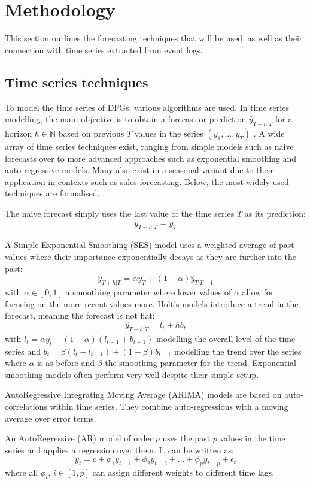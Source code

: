 \section{Methodology}\label{sec:methodology}
This section outlines the forecasting techniques that will be used, as well as their connection with time series extracted from event logs.

\subsection{Time series techniques}
To model the time series of DFGs, various algorithms are used.
In time series modelling, the main objective is to obtain a forecast or prediction $\hat{y}_{T+h|T}$ for a horizon $h\in \mathbb{N}$ based on previous $T$ values in the series $(y_1,...,y_T)$ \cite{hyndman2018forecasting}.
A wide array of time series techniques exist, ranging from simple models such as naive forecasts over to more advanced approaches such as exponential smoothing and auto-regressive models.
Many also exist in a seasonal variant due to their application in contexts such as sales forecasting.
Below, the most-widely used techniques are formalised.

The naive forecast simply uses the last value of the time series $T$ as its prediction:
\[\hat{y}_{T+h|T}=y_T\]

A Simple Exponential Smoothing (SES) model uses a weighted average of past values where their importance exponentially decays as they are further into the past:
\[\hat{y}_{T+h|T}=\alpha y_T + (1-\alpha)\hat{y}_{T|T-1}\]
with $\alpha \in [0,1]$ a smoothing parameter where lower values of $\alpha$ allow for focusing on the more recent values more.
Holt's models introduce a trend in the forecast, meaning the forecast is not flat:
\[\hat{y}_{T+h|T}=l_t + hb_t\]
with $l_t = \alpha y_t + (1-\alpha)(l_{t-1}+b_{t-1})$ modelling the overall level of the time series and $b_t=\beta(l_t-l_{t-1})+(1-\beta)b_{t-1}$ modelling the trend over the series where $\alpha$ is as before and $\beta$ the smoothing parameter for the trend.
Exponential smoothing models often perform very well despite their simple setup.

AutoRegressive Integrating Moving Average (ARIMA) models are based on auto-correlations within time series. 
They combine auto-regressions with a moving average over error terms.

An AutoRegressive (AR) model of order $p$ uses the past $p$ values in the time series and applies a regression over them. 
It can be written as:
\[y_t=c+\phi_1 y_{t-1} + \phi_2 y_{t-2} + \dots + \phi_p y_{t-p} + \epsilon_t\]
where all $\phi_i,\, i\in[1,p]$ can assign different weights to different time lags.

